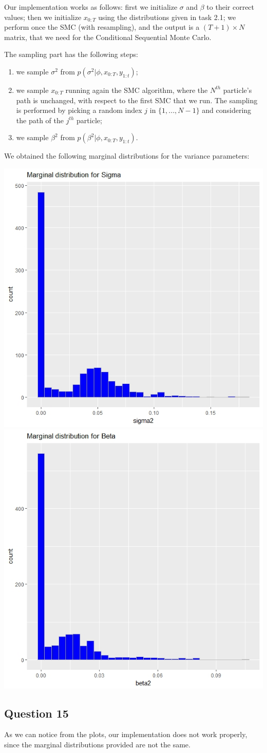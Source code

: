 \documentclass[]{article}
\begin{document}
Our implementation works as follows: first we initialize $\sigma$ and $\beta$ to their correct values; then we initialize $x_{0:T}$ using the distributions given in task 2.1; we perform once the SMC (with resampling), and the output is a $(T+1) \times N$ matrix, that we need for the Conditional Sequential Monte Carlo.

The sampling part has the following steps:
\begin{enumerate}
	\item we sample $\sigma^2$ from $p(\sigma^2|\phi, x_{0:T}, y_{1:t})$;
	\item we sample $x_{0:T}$ running again the SMC algorithm, where  the $N^{th}$ particle's path is unchanged, with respect to the first SMC that we run. The sampling is performed by picking a random index $j$ in $\{1,...,N-1\}$ and considering the path of the $j^{th}$ particle;
	\item we sample $\beta^2$ from $p(\beta^2|\phi, x_{0:T}, y_{1:t})$.
\end{enumerate}

We obtained the following marginal distributions for the variance parameters:
\begin{center}
	\includegraphics[width=.4\textwidth]{task5/CSMC_sigma2.jpeg}
	\includegraphics[width=.4\textwidth]{task5/CSMC_beta2.jpeg}
\end{center}

\subsection*{Question 15}
As we can notice from the plots, our implementation does not work properly, since the marginal distributions provided are not the same. 
\end{document}
